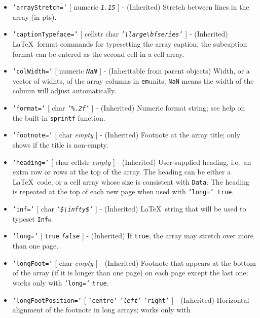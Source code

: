 \begin{itemize}
\item
  \texttt{'arrayStretch='} {[} numeric \textbar{} \emph{\texttt{1.15}}
  {]} - (Inherited) Stretch between lines in the array (in pts).
\item
  \texttt{'captionTypeface='} {[} cellstr \textbar{} char \textbar{}
  \emph{\texttt{'\textbackslash{}large\textbackslash{}bfseries'}} {]} -
  (Inherited) \LaTeX~format commands for typesetting the array caption;
  the subcaption format can be entered as the second cell in a cell
  array.
\item
  \texttt{'colWidth='} {[} numeric \textbar{} \emph{\texttt{NaN}} {]} -
  (Inheritable from parent objects) Width, or a vector of widhts, of the
  array columns in \texttt{em}units; \texttt{NaN} means the width of the
  column will adjust automatically.
\item
  \texttt{'format='} {[} char \textbar{} \emph{\texttt{'\%.2f'}} {]} -
  (Inherited) Numeric format string; see help on the built-in
  \texttt{sprintf} function.
\item
  \texttt{'footnote='} {[} char \textbar{} \emph{empty} {]} -
  (Inherited) Footnote at the array title; only shows if the title is
  non-empty.
\item
  \texttt{'heading='} {[} char \textbar{} cellstr \textbar{}
  \emph{empty} {]} - (Inherited) User-supplied heading, i.e.~an extra
  row or rows at the top of the array. The heading can be either a
  \LaTeX~code, or a cell array whose size is consistent with
  \texttt{Data}. The heading is repeated at the top of each new page
  when used with \texttt{'long=' true}.
\item
  \texttt{'inf='} {[} char \textbar{}
  \emph{\texttt{'\$\textbackslash{}infty\$'}} {]} - (Inherited)
  \LaTeX~string that will be used to typeset \texttt{Inf}s.
\item
  \texttt{'long='} {[} \texttt{true} \textbar{} \emph{\texttt{false}}
  {]} - (Inherited) If \texttt{true}, the array may stretch over more
  than one page.
\item
  \texttt{'longFoot='} {[} char \textbar{} \emph{empty} {]} -
  (Inherited) Footnote that appears at the bottom of the array (if it is
  longer than one page) on each page except the last one; works only
  with \texttt{'long='} \texttt{true}.
\item
  \texttt{'longFootPosition='} {[} \texttt{'centre'} \textbar{}
  \emph{\texttt{'left'}} \textbar{} \texttt{'right'} {]} - (Inherited)
  Horizontal alignment of the footnote in long arrays; works only with

\end{itemize}
